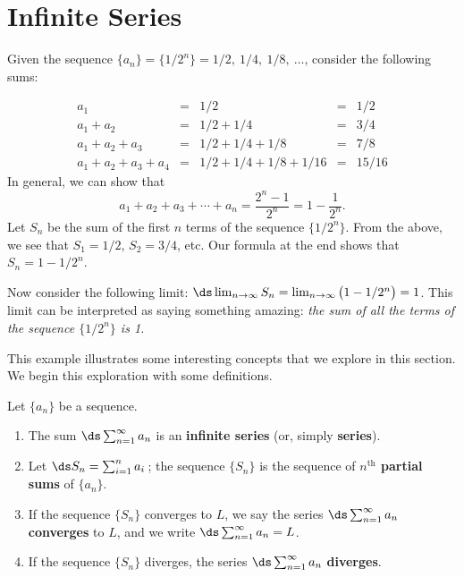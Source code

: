 \section{Infinite Series}\label{sec:series}

Given the sequence $\{a_n\} = \{1/2^n\} = 1/2,\ 1/4,\ 1/8,\ \ldots$, consider the following sums:

$$\begin{array}{ccccc}
a_1				&=& 1/2					 &=& 1/2\\
a_1+a_2		&=& 1/2+1/4			 &=& 3/4\\
a_1+a_2+a_3 &=& 1/2+1/4+1/8  &=& 7/8\\
a_1+a_2+a_3+a_4 &=& 1/2+1/4+1/8+1/16 & =& 15/16
\end{array}$$
In general, we can show that $$a_1+a_2+a_3+\cdots +a_n = \frac{2^n-1}{2^n} = 1-\frac{1}{2^n}.$$
Let $S_n$ be the sum of the first $n$ terms of the sequence $\{1/2^n\}$. From the above, we see that $S_1=1/2$, $S_2 = 3/4$, etc. Our formula at the end shows that $S_n = 1-1/2^n$. 

Now consider the following limit: $\ds \lim_{n\to\infty}S_n = \lim_{n\to\infty}\big(1-1/2^n\big) = 1$. This limit can be interpreted as saying something amazing: \emph{the sum of \emph{all} the terms of the sequence $\{1/2^n\}$ is 1.} 

\enlargethispage{2\baselineskip}

This example illustrates some interesting concepts that we explore in this section. We begin this exploration with some definitions.

{Let $\{a_n\}$ be a sequence.
\begin{enumerate}
\item		The sum $\ds \sum_{n=1}^\infty a_n$ is an \textbf{infinite series} (or, simply \textbf{series}).
\item		Let $\ds S_n = \sum_{i=1}^n a_i$\,; the sequence $\{S_n\}$ is the sequence of \textbf{$n^\text{th}$ partial sums} of $\{a_n\}$.
\item		If the sequence $\{S_n\}$ converges to $L$, we say the series $\ds \sum_{n=1}^\infty a_n$ \textbf{converges} to $L$, and we write $\ds \sum_{n=1}^\infty a_n = L$.
\item		If the sequence $\{S_n\}$ diverges, the series $\ds \sum_{n=1}^\infty a_n$ \textbf{diverges}.
\end{enumerate}
}
\restoreboxwidth

